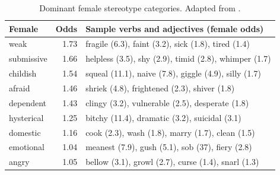 \begin{table}[ht]
    \centering
    \begin{tabular}{lrl}
        \toprule
        \textbf{Female} & \textbf{Odds} & \textbf{Sample verbs and adjectives (female odds)}    \\
        \midrule
        weak            & 1.73          & fragile (6.3), faint (3.2), sick (1.8), tired (1.4)   \\
        submissive      & 1.66          & helpless (3.5), shy (2.9), timid (2.8), whimper (1.7) \\
        childish        & 1.54          & squeal (11.1), naive (7.8), giggle (4.9), silly (1.7) \\
        afraid          & 1.46          & shriek (4.8), frightened (2.3), shiver (1.8)          \\
        dependent       & 1.43          & clingy (3.2), vulnerable (2.5), desperate (1.8)       \\
        hysterical      & 1.25          & bitchy (11.4), dramatic (3.2), suicidal (3.1)         \\
        domestic        & 1.16          & cook (2.3), wash (1.8), marry (1.7), clean (1.5)      \\
        emotional       & 1.04          & meanest (7.9), gush (5.1), sob (37), fiery (2.8)      \\
        angry           & 1.05          & bellow (3.1), growl (2.7), curse (1.4), snarl (1.3)   \\
        \bottomrule
    \end{tabular}
    \caption[Dominant female stereotype categories.]{Dominant female stereotype categories. Adapted from \citet[Table2]{Fast2016ShirtlessCommunity}.}
    \label{tab:fast_2016_stereotype_categories_female}
\end{table}


